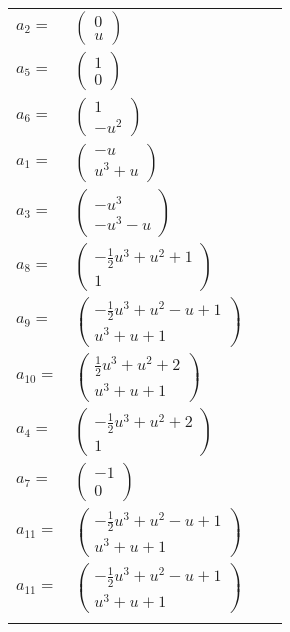 \documentclass[1p]{elsarticle_modified}
\theoremstyle{definition}
\begin{document}
\begin{tabular}{m{7pt} m{180pt} m{7pt} m{180pt} }
\flushright $a_{2}=$&$\begin{pmatrix}0\\u\end{pmatrix}$ \\
\flushright $a_{5}=$&$\begin{pmatrix}1\\0\end{pmatrix}$ \\
\flushright $a_{6}=$&$\begin{pmatrix}1\\- u^2\end{pmatrix}$ \\
\flushright $a_{1}=$&$\begin{pmatrix}- u\\u^3+u\end{pmatrix}$ \\
\flushright $a_{3}=$&$\begin{pmatrix}- u^3\\- u^3- u\end{pmatrix}$ \\
\flushright $a_{8}=$&$\begin{pmatrix}-\frac{1}{2} u^3+u^2+1\\1\end{pmatrix}$ \\
\flushright $a_{9}=$&$\begin{pmatrix}-\frac{1}{2} u^3+u^2- u+1\\u^3+u+1\end{pmatrix}$ \\
\flushright $a_{10}=$&$\begin{pmatrix}\frac{1}{2} u^3+u^2+2\\u^3+u+1\end{pmatrix}$ \\
\flushright $a_{4}=$&$\begin{pmatrix}-\frac{1}{2} u^3+u^2+2\\1\end{pmatrix}$ \\
\flushright $a_{7}=$&$\begin{pmatrix}-1\\0\end{pmatrix}$ \\
\flushright $a_{11}=$&$\begin{pmatrix}-\frac{1}{2} u^3+u^2- u+1\\u^3+u+1\end{pmatrix}$\\ \flushright $a_{11}=$&$\begin{pmatrix}-\frac{1}{2} u^3+u^2- u+1\\u^3+u+1\end{pmatrix}$\\&\end{tabular}
\end{document}

